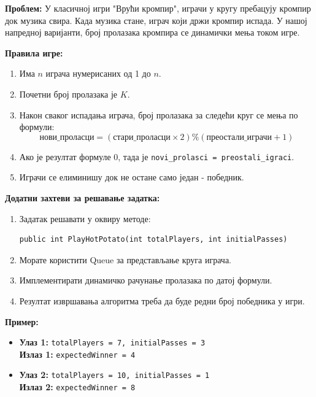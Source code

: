 \textbf{Проблем:} У класичној игри "Врући кромпир", играчи у кругу пребацују кромпир док музика свира. Када музика стане, играч који држи кромпир испада. У нашој напредној варијанти, број пролазака кромпира се динамички мења током игре.

\textbf{Правила игре:}
\begin{enumerate}
	\item Има $n$ играча нумерисаних од 1 до $n$.
	\item Почетни број пролазака је $K$.
	\item Након сваког испадања играча, број пролазака за следећи круг се мења по формули:
	$$
	\text{нови\_проласци} = (\text{стари\_проласци} \times 2) \% (\text{преостали\_играчи} + 1)
	$$
	\item Ако је резултат формуле 0, тада је \texttt{novi\_prolasci = preostali\_igraci}.
	\item Играчи се елиминишу док не остане само један - победник.
\end{enumerate}

\textbf{Додатни захтеви за решавање задатка:}
\begin{enumerate}
	\item Задатак решавати у оквиру методе:
	\begin{Verbatim}[fontsize=\small]
public int PlayHotPotato(int totalPlayers, int initialPasses)
	\end{Verbatim}
	\item Морате користити Queue за представљање круга играча.
	\item Имплементирати динамичко рачунање пролазака по датој формули.
	\item Резултат извршавања алгоритма треба да буде редни број победника у игри.
\end{enumerate}

\textbf{Пример:}
\begin{itemize}
	\item \textbf{Улаз 1:} \texttt{totalPlayers = 7, initialPasses = 3} \\
	      \textbf{Излаз 1:} \texttt{expectedWinner = 4}
	\item \textbf{Улаз 2:} \texttt{totalPlayers = 10, initialPasses = 1} \\
	      \textbf{Излаз 2:} \texttt{expectedWinner = 8}
\end{itemize}

